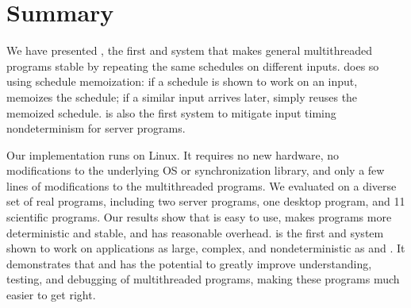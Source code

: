 \section{Summary}
\label{sec:tern-summary}

We have presented \tern, the first \smt and \dmt system that makes general
multithreaded programs stable by repeating the same schedules on different
inputs.  \tern does so using schedule memoization: if a schedule is shown
to work on an input, \tern memoizes the schedule; if a similar input
arrives later, \tern simply reuses the memoized schedule. \tern is also the
first \dmt system to mitigate input timing nondeterminism for server
programs.

Our \tern implementation runs on Linux.  It requires no new hardware, no
modifications to the underlying OS or synchronization library, and only a
few lines of modifications to the multithreaded programs.  We evaluated
\tern on a diverse set of real programs, including two server programs, one
desktop program, and 11 scientific programs.  Our results show that
\tern is easy to use, makes programs more deterministic and stable, and has
reasonable overhead.  \tern is the first \smt and \dmt system shown to work on
applications as large, complex, and nondeterministic as \mysql and \apache.
It demonstrates that \smt and \dmt has the potential to greatly improve
understanding, testing, and debugging of multithreaded programs, making these
programs much easier to get right.

